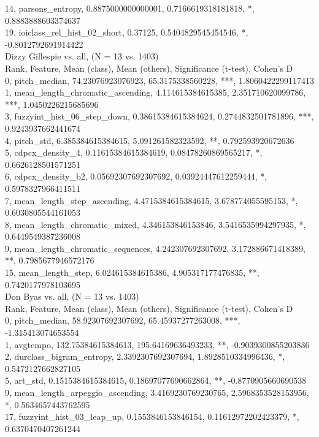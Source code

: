 14, parsons_entropy, 0.8875000000000001, 0.7166619318181818, *, 0.8883888603374637\\
19, ioiclass_rel_hist_02_short, 0.37125, 0.5404829545454546, *, -0.8012792691914422\\
Dizzy Gillespie vs. all, (N = 13 vs. 1403)\\
Rank, Feature, Mean (class), Mean (others), Significance (t-test), Cohen's D\\
0, pitch_median, 74.23076923076923, 65.3175338560228, ***, 1.8060422299117413\\
1, mean_length_chromatic_ascending, 4.114615384615385, 2.351710620099786, ***, 1.0450226215685696\\
3, fuzzyint_hist_06_step_down, 0.38615384615384624, 0.2744832501781896, ***, 0.9243937662441674\\
4, pitch_std, 6.385384615384615, 5.091261582323592, **, 0.792593920672636\\
5, cdpcx_density_4, 0.11615384615384619, 0.08478260869565217, *, 0.6626128501571251\\
6, cdpcx_density_b2, 0.05692307692307692, 0.03924447612259444, *, 0.5978327966411511\\
7, mean_length_step_ascending, 4.4715384615384615, 3.678774055595153, *, 0.6030805544161053\\
8, mean_length_chromatic_mixed, 4.346153846153846, 3.5416535994297935, *, 0.6449549387236008\\
9, mean_length_chromatic_sequences, 4.242307692307692, 3.172886671418389, **, 0.7985677946572176\\
15, mean_length_step, 6.024615384615386, 4.905317177476835, **, 0.7420177978103695\\
Don Byas vs. all, (N = 13 vs. 1403)\\
Rank, Feature, Mean (class), Mean (others), Significance (t-test), Cohen's D\\
0, pitch_median, 58.92307692307692, 65.45937277263008, ***, -1.315413074653554\\
1, avgtempo, 132.75384615384613, 195.64169636493233, **, -0.9039300855203836\\
2, durclass_bigram_entropy, 2.3392307692307694, 1.8928510334996436, *, 0.5472127662827105\\
5, art_std, 0.1515384615384615, 0.18697077690662864, **, -0.8770905660690538\\
9, mean_length_arpeggio_ascending, 3.4169230769230765, 2.5968353528153956, *, 0.5634657443762595\\
17, fuzzyint_hist_03_leap_up, 0.1553846153846154, 0.11612972202423379, *, 0.6370470407261244\\
